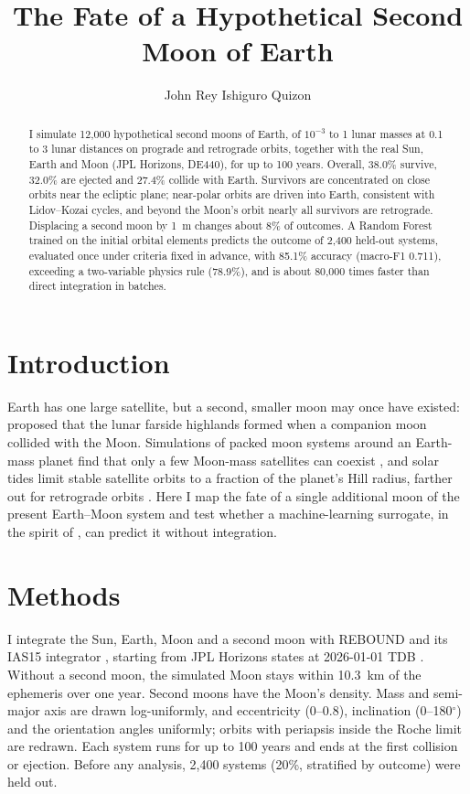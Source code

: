 \documentclass[RNAAS]{aastex631}
\begin{document}
\title{The Fate of a Hypothetical Second Moon of Earth}

\author{John Rey Ishiguro Quizon}

\begin{abstract}
I simulate 12,000 hypothetical second moons of Earth, of $10^{-3}$ to 1 lunar masses at 0.1 to 3
lunar distances on prograde and retrograde orbits, together with the real Sun, Earth and Moon (JPL
Horizons, DE440), for up to 100 years. Overall, 38.0\% survive, 32.0\% are ejected and 27.4\%
collide with Earth. Survivors are concentrated on close orbits near the ecliptic plane; near-polar
orbits are driven into Earth, consistent with Lidov--Kozai cycles, and beyond the Moon's orbit
nearly all survivors are retrograde. Displacing a second moon by 1~m changes about 8\% of
outcomes. A Random Forest trained on the initial orbital elements predicts the outcome of 2,400
held-out systems, evaluated once under criteria fixed in advance, with 85.1\% accuracy (macro-F1
0.711), exceeding a two-variable physics rule (78.9\%), and is about 80,000 times faster than
direct integration in batches.
\end{abstract}


\section{Introduction}

Earth has one large satellite, but a second, smaller moon may once have existed:
\citet{Jutzi2011} proposed that the lunar farside highlands formed when a companion moon collided
with the Moon. Simulations of packed moon systems around an Earth-mass planet find that only a few
Moon-mass satellites can coexist \citep{Satyal2022}, and solar tides limit stable satellite orbits
to a fraction of the planet's Hill radius, farther out for retrograde orbits \citep{Domingos2006}.
Here I map the fate of a single additional moon of the present Earth--Moon system and test whether
a machine-learning surrogate, in the spirit of \citet{Tamayo2020}, can predict it without
integration.

\section{Methods}

I integrate the Sun, Earth, Moon and a second moon with REBOUND and its IAS15 integrator
\citep{Rein2012, Rein2015}, starting from JPL Horizons states at 2026-01-01 TDB \citep[DE440;][]{Park2021}.
Without a second moon, the simulated Moon stays within 10.3~km of the ephemeris over one year.
Second moons have the Moon's density. Mass and semi-major axis are drawn log-uniformly, and
eccentricity (0--0.8), inclination (0--180$^\circ$) and the orientation angles uniformly; orbits
with periapsis inside the Roche limit are redrawn. Each system runs for up to 100 years and ends at
the first collision or ejection. Before any analysis, 2,400 systems (20\%, stratified by outcome)
were held out.
\end{document}
